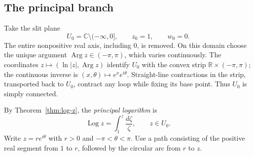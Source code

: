 \documentclass[11pt]{article}
\theoremstyle{plain}
\theoremstyle{definition}
\theoremstyle{remark}
\numberwithin{equation}{section}
\newcommand{\C}{\mathbb{C}}
\newcommand{\R}{\mathbb{R}}
\DeclareMathOperator{\Log}{Log}
\DeclareMathOperator{\Arg}{Arg}
\newenvironment{lecturefigure}
 {\par\addvspace{0.25em}\begingroup\setlength{\parskip}{0pt}\centering}
 {\par\endgroup\addvspace{0.25em}}
\begin{document}
\begin{lecturefigure}
\end{lecturefigure}

\subsection{The principal branch}\label{sec:principal-log}
Take the slit plane
\[
 U_0=\C\setminus(-\infty,0],\qquad z_0=1,\qquad w_0=0.
\]
The entire nonpositive real axis, including $0$, is removed. On this
domain choose the unique argument $\Arg z\in(-\pi,\pi)$, which varies
continuously. The coordinates $z\mapsto(\ln|z|,\Arg z)$ identify $U_0$
with the convex strip $\R\times(-\pi,\pi)$; the continuous inverse is
$(x,\theta)\mapsto e^x e^{i\theta}$. Straight-line contractions in the
strip, transported back to $U_0$, contract any loop while fixing its
base point. Thus $U_0$ is simply connected.

By Theorem~\ref{thm:log-z}, the \emph{principal logarithm} is
\[
 \Log z=\int_1^z\frac{d\zeta}{\zeta},\qquad z\in U_0.
\]
Write $z=re^{i\theta}$ with $r>0$ and $-\pi<\theta<\pi$.
Use a path consisting of the positive real segment from $1$ to $r$,
followed by the circular arc from $r$ to $z$.
\end{document}
